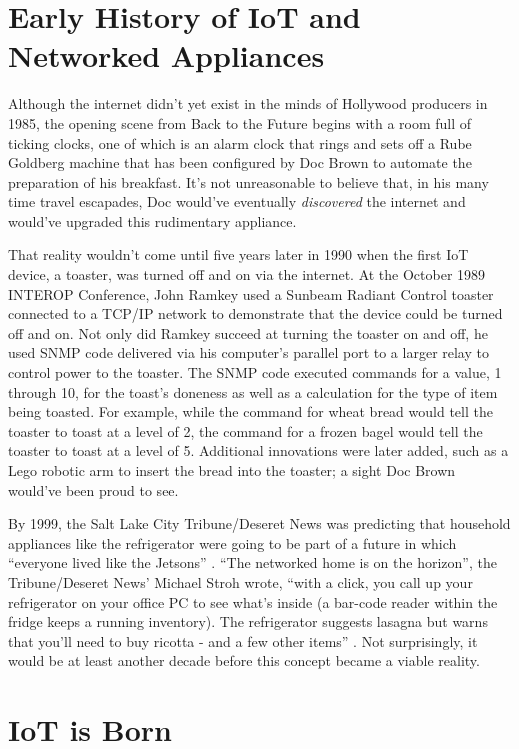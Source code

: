 \documentclass[sigconf]{acmart}
\begin{document}
\section{Early History of IoT and Networked Appliances}

Although the internet didn't yet exist in the minds of Hollywood producers in 1985, the opening scene from Back to the Future begins with a room full of ticking clocks, one of which is an alarm clock that rings and sets off a Rube Goldberg machine that has been configured by Doc Brown to automate the preparation of his breakfast. It's not unreasonable to believe that, in his many time travel escapades, Doc would've eventually {\em discovered} the internet and would've upgraded this rudimentary appliance. 
\par
That reality wouldn't come until five years later in 1990 when the first IoT device, a toaster, was turned off and on via the internet. At the October 1989 INTEROP Conference, John Ramkey used a Sunbeam Radiant Control toaster connected to a TCP/IP network to demonstrate that the device could be turned off and on\cite{Ramkey01}. Not only did Ramkey succeed at turning the toaster on and off, he used SNMP code delivered via his computer's parallel port to a larger relay to control power to the toaster. The SNMP code executed commands for a value, 1 through 10, for the toast's doneness as well as a calculation for the type of item being toasted. For example, while the command for wheat bread would tell the toaster to toast at a level of 2, the command for a frozen bagel would tell the toaster to toast at a level of 5. Additional innovations were later added, such as a Lego robotic arm to insert the bread into the toaster; a sight Doc Brown would've been proud to see.
\par
By 1999, the Salt Lake City Tribune/Deseret News was predicting that household appliances like the refrigerator were going to be part of a future in which ``everyone lived like the Jetsons'' \cite{Deseret1999}. ``The networked home is on the horizon'', the Tribune/Deseret News' Michael Stroh wrote, ``with a click, you call up your refrigerator on your office PC to see what's inside (a bar-code reader within the fridge keeps a running inventory). The refrigerator suggests lasagna but warns that you'll need to buy ricotta - and a few other items'' \cite{Deseret1999}. Not surprisingly, it would be at least another decade before this concept became a viable reality. 

\section{IoT is Born}
\end{document}
